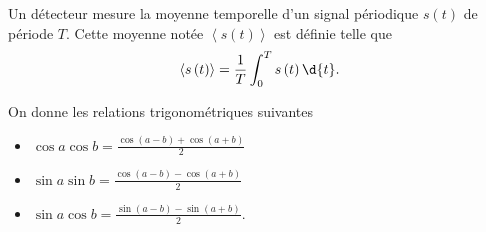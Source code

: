 
\finEntrainement







\hauteurLargeurCadreReponse		{6mm}{6.75cm}
\initialisationEntrainement

                                \initialisationPartieGauche %
\begin{minipage}{0.9\linewidth}
Un détecteur mesure la moyenne temporelle d'un signal périodique $s\left(t \right)$ de période $T$. Cette moyenne notée $\left< s\left( t \right) \right>$ est définie telle que
$$
\left< s\left( t \right) \right> = \frac{1}{T} \int_0^{T} s\left( t \right)  \d{t}.
$$
\end{minipage}
								\initialisationPartieDroite %
\begin{minipage}{0.9\linewidth}
On donne les relations trigonométriques suivantes
	\begin{itemize}
		\item $\cos a \cos b = \frac{\cos\left( a-b \right)+\cos\left( a+b \right) }{2}$
		\item $\sin a \sin b = \frac{\cos\left( a-b \right)-\cos\left( a+b \right) }{2}$
		\item $\sin a \cos b = \frac{\sin\left( a-b \right)-\sin\left( a+b \right) }{2}$.
	\end{itemize}
\end{minipage}

